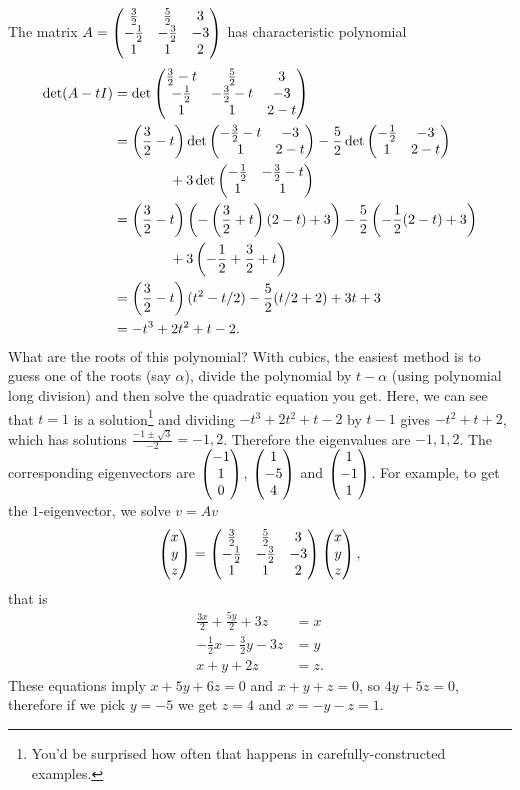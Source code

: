 \documentclass{article}
\begin{document}
\begin{Example}
The matrix \(A=\begin{pmatrix} \frac{3}{2} & \frac{5}{2} & 3 \\ -\frac{1}{2} &
-\frac{3}{2} & -3 \\ 1 & 1 & 2 \end{pmatrix}\) has characteristic polynomial
\begin{align*}
\det(A-tI)&=\det\begin{pmatrix} \frac{3}{2}-t & \frac{5}{2} & 3 \\ -\frac{1}{2} &
-\frac{3}{2}-t & -3 \\ 1 & 1 & 2-t\end{pmatrix}\\
&=\left(\frac{3}{2}-t\right)\det\begin{pmatrix} -\frac{3}{2}-t & -3 \\ 1 & 2-t\end{pmatrix} -\frac{5}{2}\det\begin{pmatrix} -\frac{1}{2} & -3 \\ 1 & 2-t\end{pmatrix}\\
&\qquad\qquad +3\det\begin{pmatrix} -\frac{1}{2} & -\frac{3}{2}-t \\ 1 & 1\end{pmatrix}\\
&=\left(\frac{3}{2}-t\right)\left(-\left(\frac{3}{2}+t\right)\left(2-t\right)+3\right)-\frac{5}{2}\left(-\frac{1}{2}(2-t)+3\right)\\
&\qquad\qquad+3\left(-\frac{1}{2}+\frac{3}{2}+t\right)\\
&=\left(\frac{3}{2}-t\right)(t^2-t/2)-\frac{5}{2}(t/2+2)+3t+3\\
&=-t^3+2t^2+t-2.
\end{align*}
What are the roots of this polynomial? With cubics, the easiest
method is to guess one of the roots (say \(\alpha\)), divide the
polynomial by \(t-\alpha\) (using polynomial long division) and then
solve the quadratic equation you get. Here, we can see that \(t=1\)
is a solution\footnote{You'd be surprised how often that happens in
carefully-constructed examples.} and dividing \(-t^3+2t^2+t-2\) by
\(t-1\) gives \(-t^2+t+2\), which has solutions \(\frac{-1\pm
\sqrt{3}}{-2}=-1,2\). Therefore the eigenvalues are \(-1,1,2\). The
corresponding eigenvectors are \(\begin{pmatrix} -1 \\ 1 \\ 0\end{pmatrix}\), \(\begin{pmatrix} 1
\\ -5 \\ 4 \end{pmatrix}\) and \(\begin{pmatrix} 1 \\ -1 \\ 1 \end{pmatrix}\). For example, to get
the \(1\)-eigenvector, we solve \(v=Av\) \[\begin{pmatrix} x \\ y \\ z\end{pmatrix}=\begin{pmatrix}
\frac{3}{2} & \frac{5}{2} & 3 \\ -\frac{1}{2} & -\frac{3}{2} & -3
\\ 1 & 1 & 2 \end{pmatrix}\begin{pmatrix} x \\ y \\ z\end{pmatrix},\] that is
\begin{align*}
\frac{3x}{2}+\frac{5y}{2}+3z&=x\\
-\frac{1}{2}x-\frac{3}{2}y-3z&=y\\
x+y+2z&=z.
\end{align*}
These equations imply \(x+5y+6z=0\) and \(x+y+z=0\), so \(4y+5z=0\),
therefore if we pick \(y=-5\) we get \(z=4\) and \(x=-y-z=1\).


\end{Example}
\clearpage
\end{document}
